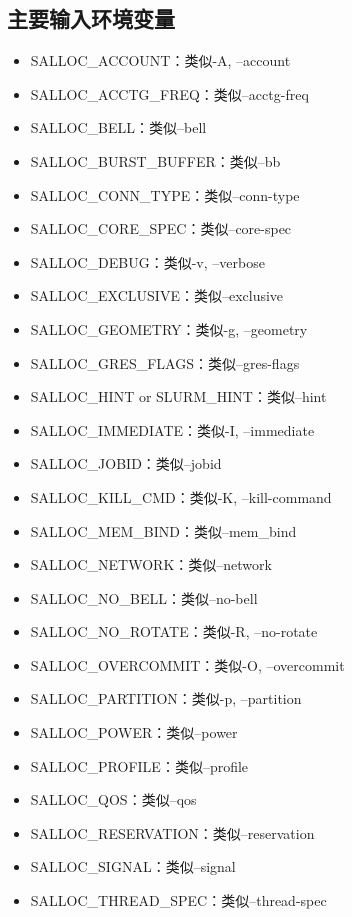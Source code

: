 \subsection{主要输入环境变量}
\begin{itemize}
	\item SALLOC\_ACCOUNT：类似-A, --account
	\item SALLOC\_ACCTG\_FREQ：类似--acctg-freq
	\item SALLOC\_BELL：类似--bell
	\item SALLOC\_BURST\_BUFFER：类似--bb
	\item SALLOC\_CONN\_TYPE：类似--conn-type
	\item SALLOC\_CORE\_SPEC：类似--core-spec
	\item SALLOC\_DEBUG：类似-v, --verbose
	\item SALLOC\_EXCLUSIVE：类似--exclusive
	\item SALLOC\_GEOMETRY：类似-g, --geometry
	\item SALLOC\_GRES\_FLAGS：类似--gres-flags
	\item SALLOC\_HINT or SLURM\_HINT：类似--hint
	\item SALLOC\_IMMEDIATE：类似-I, --immediate
	\item SALLOC\_JOBID：类似--jobid
	\item SALLOC\_KILL\_CMD：类似-K, --kill-command
	\item SALLOC\_MEM\_BIND：类似--mem\_bind
	\item SALLOC\_NETWORK：类似--network
	\item SALLOC\_NO\_BELL：类似--no-bell
	\item SALLOC\_NO\_ROTATE：类似-R, --no-rotate
	\item SALLOC\_OVERCOMMIT：类似-O, --overcommit
	\item SALLOC\_PARTITION：类似-p, --partition
	\item SALLOC\_POWER：类似--power
	\item SALLOC\_PROFILE：类似--profile
	\item SALLOC\_QOS：类似--qos
	\item SALLOC\_RESERVATION：类似--reservation
	\item SALLOC\_SIGNAL：类似--signal
	\item SALLOC\_THREAD\_SPEC：类似--thread-spec

\end{itemize}
